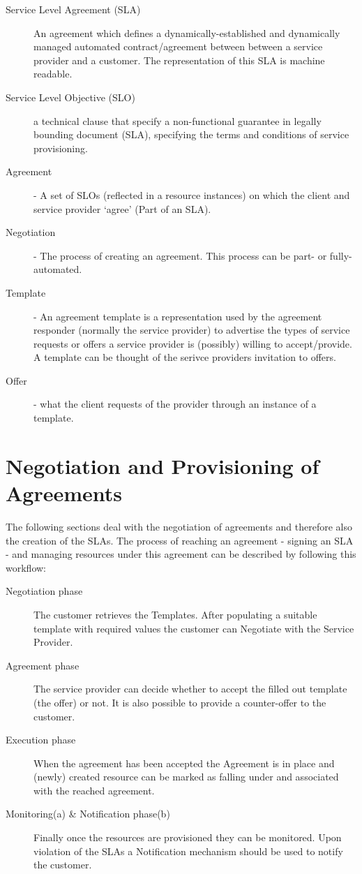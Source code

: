 \documentclass[12pt]{article}  %
\begin{document}
\begin{description}
\item[Service Level Agreement (SLA)] An agreement which defines a dynamically-established and dynamically managed automated contract/agreement between between a service provider and a customer. The representation of this SLA is machine readable.
\item[Service Level Objective (SLO)] a technical clause that specify a non-functional guarantee in legally bounding document (SLA), specifying the terms and conditions of service provisioning.
\item[Agreement] - A set of SLOs (reflected in a resource instances) on which the client and service provider ‘agree’ (Part of an SLA).
\item[Negotiation] - The process of creating an agreement. This process can be part- or fully-automated.
\item[Template] - An agreement template is a representation used by the agreement responder (normally the service provider) to advertise the types of service requests or offers a service provider is (possibly) willing to accept/provide. A template can be thought of the serivce providers invitation to offers.
\item[Offer] - what the client requests of the provider through an instance of a template.
\end{description}

\section{Negotiation and Provisioning of Agreements}

The following sections deal with the negotiation of agreements and therefore also the creation of the SLAs. The process of reaching an agreement - signing an SLA - and managing resources under this agreement can be described by following this workflow:

\begin{description}
\item[Negotiation phase] The customer retrieves the Templates. After populating a suitable template with required values the customer can Negotiate with the Service Provider.
\item[Agreement phase] The service provider can decide whether to accept the filled out template (the offer) or not. It is also possible to provide a counter-offer to the customer.
\item[Execution phase] When the agreement has been accepted the Agreement is in place and (newly) created resource can be marked as falling under and associated with the reached agreement.
\item[Monitoring(a) \& Notification phase(b)] Finally once the resources are provisioned they can be monitored. Upon violation of the SLAs a Notification mechanism should be used to notify the customer.
\end{description}
\end{document}
